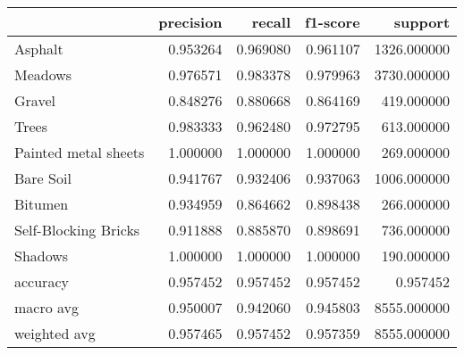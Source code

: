 \begin{tabular}{lrrrr}
\toprule
{} &  precision &    recall &  f1-score &      support \\
\midrule
Asphalt              &   0.953264 &  0.969080 &  0.961107 &  1326.000000 \\
Meadows              &   0.976571 &  0.983378 &  0.979963 &  3730.000000 \\
Gravel               &   0.848276 &  0.880668 &  0.864169 &   419.000000 \\
Trees                &   0.983333 &  0.962480 &  0.972795 &   613.000000 \\
Painted metal sheets &   1.000000 &  1.000000 &  1.000000 &   269.000000 \\
Bare Soil            &   0.941767 &  0.932406 &  0.937063 &  1006.000000 \\
Bitumen              &   0.934959 &  0.864662 &  0.898438 &   266.000000 \\
Self-Blocking Bricks &   0.911888 &  0.885870 &  0.898691 &   736.000000 \\
Shadows              &   1.000000 &  1.000000 &  1.000000 &   190.000000 \\
accuracy             &   0.957452 &  0.957452 &  0.957452 &     0.957452 \\
macro avg            &   0.950007 &  0.942060 &  0.945803 &  8555.000000 \\
weighted avg         &   0.957465 &  0.957452 &  0.957359 &  8555.000000 \\
\bottomrule
\end{tabular}

